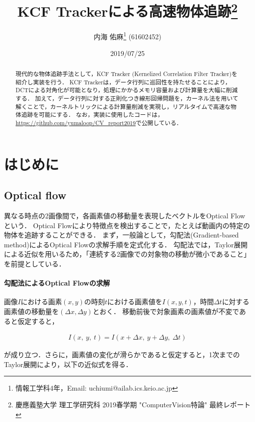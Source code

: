 \documentclass[11pt,a4j]{jarticle}
\title{{KCF Trackerによる高速物体追跡}\thanks{慶應義塾大学 理工学研究科 2019春学期 "ComputerVision特論" 最終レポート} \\ }
\author{内海 佑麻\thanks{情報工学科4年，Email: uchiumi@ailab.ics.keio.ac.jp} (61602452)}
\date{2019/07/25}
\begin{document}
  \maketitle
  \begin{abstract}
    現代的な物体追跡手法として，KCF Tracker (Kernelized Correlation Filter Tracker)を紹介し実装を行う．
    KCF Trackerは，データ行列に巡回性を持たせることにより，DCTによる対角化が可能となり，処理にかかるメモリ容量および計算量を大幅に削減する．
    加えて，データ行列に対する正則化つき線形回帰問題を，カーネル法を用いて解くことで，カーネルトリックによる計算量削減を実現し，リアルタイムで高速な物体追跡を可能にする．
    なお，実装に使用したコードは，\url{https://github.com/yumaloop/CV_report2019}で公開している．
  \end{abstract}
  \tableofcontents

  \newpage

  \section{はじめに}

    \subsection{Optical flow}
      異なる時点の2画像間で，各画素値の移動量を表現したベクトルをOptical Flowという．
      Optical Flowにより特徴点を検出することで，たとえば動画内の特定の物体を追跡することができる．
      まず，一般論として，勾配法(Gradient-based method)によるOptical Flowの求解手順を定式化する．
      勾配法では，Taylor展開による近似を用いるため，「連続する2画像での対象物の移動が微小であること」を前提としている．

      \paragraph{勾配法によるOptical Flowの求解}
      画像$I$における画素$(x,y)$の時刻$t$における画素値を$I(x,y,t)$，時間$\Delta t$に対する画素値の移動量を$(\Delta x, \Delta y)$とおく．
      移動前後で対象画素の画素値が不変であると仮定すると，

      \begin{align}
        I(x, ~ y, ~ t) = I(x + \Delta x, ~ y + \Delta y, ~ \Delta t)
      \end{align}

      が成り立つ．さらに，画素値の変化が滑らかであると仮定すると，1次までのTaylor展開により，以下の近似式を得る．
\end{document}
